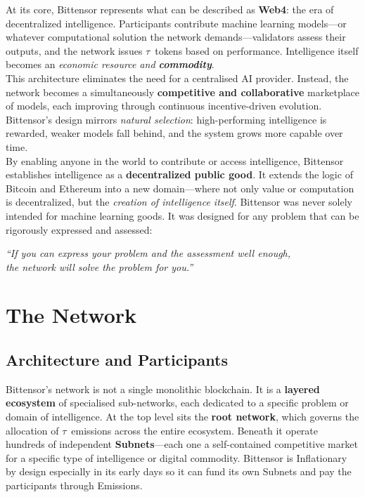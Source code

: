 \documentclass[12pt, a4paper, oneside]{report}
\newcommand{\TAO}{$\tau$}            %
\theoremstyle{definition}
\begin{document}
At its core, Bittensor represents what can be described as \textbf{Web4}: the era of 
decentralized intelligence. Participants contribute machine learning models—or whatever 
computational solution the network demands—validators assess their outputs, and the 
network issues \TAO\ tokens based on performance. Intelligence itself becomes an 
\emph{economic resource and \textbf{commodity}}.\\[0.4cm]

This architecture eliminates the need for a centralised AI provider. Instead, the 
network becomes a simultaneously \textbf{competitive and collaborative} marketplace 
of models, each improving through continuous incentive-driven evolution. Bittensor's 
design mirrors \emph{natural selection}: high-performing intelligence is rewarded, 
weaker models fall behind, and the system grows more capable over time.\\[0.4cm]

By enabling anyone in the world to contribute or access intelligence, Bittensor 
establishes intelligence as a \textbf{decentralized public good}. It extends the logic 
of Bitcoin and Ethereum into a new domain—where not only value or computation is 
decentralized, but the \emph{creation of intelligence itself}. Bittensor was never 
solely intended for machine learning goods. It was designed for any problem that can 
be rigorously expressed and assessed:

\begin{center}
\textit{``If you can express your problem and the assessment well enough,}\\
\textit{the network will solve the problem for you.''}
\end{center}






\section{The Network}
\label{sec:network}

\subsection{Architecture and Participants}

Bittensor's network is not a single monolithic blockchain. It is a \textbf{layered 
ecosystem} of specialised sub-networks, each dedicated to a specific problem or 
domain of intelligence. At the top level sits the \textbf{root network}, which 
governs the allocation of \TAO\ emissions across the entire ecosystem. Beneath it 
operate hundreds of independent \textbf{Subnets}—each one a self-contained 
competitive market for a specific type of intelligence or digital commodity. Bittensor is Inflationary by design especially in its early days so it can fund its own Subnets and pay the participants through Emissions.\\[0.4cm]
\end{document}
